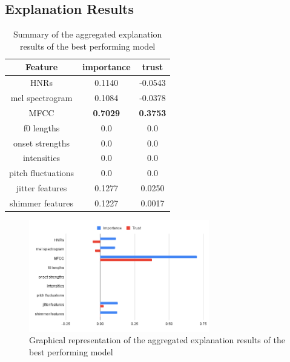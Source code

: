 \documentclass{article}
\begin{document}
		\subsection{Explanation Results}
		\begin{table}[htbp]
			\caption{Summary of the aggregated explanation results of the best performing model}
			\vspace{10pt}
			\centering
			\begin{tabular}{c | c | c}
				\hline
				Feature & importance & trust \\
				\hline
				HNRs & 0.1140 & -0.0543 \\
				mel spectrogram & 0.1084 & -0.0378 \\
				MFCC & \textbf{0.7029} & \textbf{0.3753} \\
				f0 lengths & 0.0 & 0.0 \\
				onset strengths & 0.0 & 0.0 \\
				intensities & 0.0 & 0.0 \\
				pitch fluctuations & 0.0 & 0.0 \\
				jitter features & 0.1277 & 0.0250 \\
				shimmer features & 0.1227 & 0.0017
			\end{tabular}
			\label{table:exp-results-cterm}
		\end{table}
		\begin{figure}
			\centering
			\includegraphics[width=0.7\textwidth]{images/exp_cterm.png}
			\caption{Graphical representation of the aggregated explanation results of the best
			performing model}
			\label{fig:exp_cterm}
		\end{figure}
\end{document}
